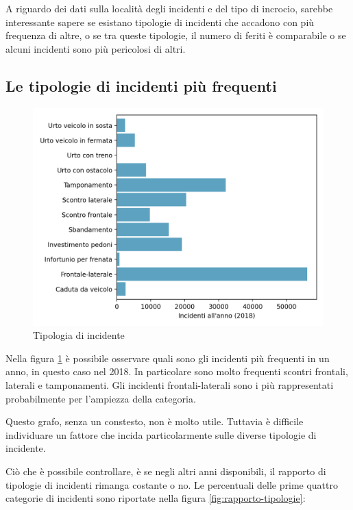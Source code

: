 \documentclass[a4paper]{report}
\begin{document}
A riguardo dei dati sulla località degli incidenti e del tipo di incrocio, sarebbe interessante 
sapere se esistano tipologie di incidenti che accadono con più frequenza di altre, o 
se tra queste tipologie, il numero di feriti è comparabile o se alcuni incidenti sono più 
pericolosi di altri.

\subsection{Le tipologie di incidenti più frequenti}

\begin{figure}
    \includegraphics[width=\linewidth]{../src/incidenti/incidenti_senza_coords/localizzazione_incidente/tipo_incidente.png}
    \caption{Tipologia di incidente}
    \label{fig:tipo-incidente}
\end{figure}

Nella figura \ref{fig:tipo-incidente} è possibile osservare quali sono gli incidenti più frequenti 
in un anno, in questo caso nel 2018.
In particolare sono molto frequenti scontri frontali, laterali e tamponamenti. 
Gli incidenti frontali-laterali sono i più rappresentati probabilmente per l'ampiezza della 
categoria.

Questo grafo, senza un constesto, non è molto utile. Tuttavia è difficile individuare un fattore che 
incida particolarmente sulle diverse tipologie di incidente.

Ciò che è possibile controllare, è se negli altri anni disponibili, il rapporto di tipologie di 
incidenti rimanga costante o no.
Le percentuali delle prime quattro categorie di incidenti sono riportate nella figura 
\ref{fig:rapporto-tipologie}: 
\end{document}
